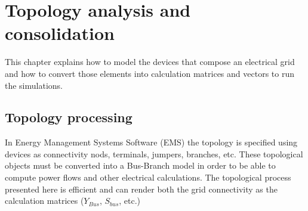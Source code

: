 \documentclass[nols,a4paper,twoside,notoc,fleqn]{tufte-book}
\begin{document}
%






\chapter{Topology analysis and consolidation} \label{topology}

This chapter explains how to model the devices that compose an electrical grid and how to convert those elements into calculation matrices and vectors to run the simulations.



\section{Topology processing}
\label{TopologyProcessing}
In Energy Management Systems Software (EMS) the topology is specified using devices as connectivity nods, terminals, jumpers, branches, etc. These topological objects must be converted into a Bus-Branch model in order to be able to compute power flows and other electrical calculations. The topological process presented here is efficient and can render both the grid connectivity as the calculation matrices ($Y_{Bus}$, $S_{bus}$, etc.)
\end{document}
